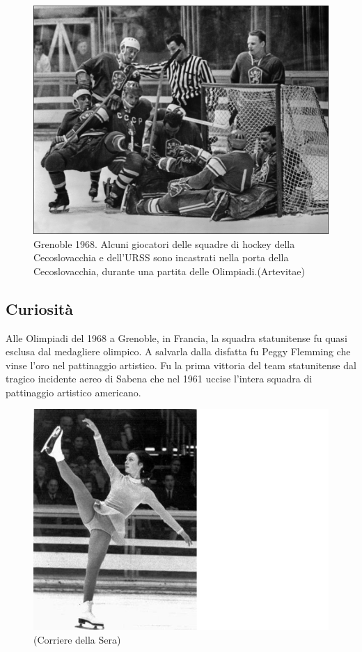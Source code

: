 \documentclass[
]{book}
\begin{document}
\begin{figure}
\includegraphics[width=0.8\linewidth]{images/ArteVitae/1968} \caption{Grenoble 1968. Alcuni giocatori delle squadre di hockey della Cecoslovacchia e dell’URSS sono incastrati nella porta della Cecoslovacchia, durante una partita delle Olimpiadi.(Artevitae)}\label{fig:unnamed-chunk-30}
\end{figure}

\subsection*{Curiosità}\label{curiosituxe0-2}

Alle Olimpiadi del 1968 a Grenoble, in Francia, la squadra statunitense fu quasi esclusa dal medagliere olimpico. A salvarla dalla disfatta fu Peggy Flemming che vinse l'oro nel pattinaggio artistico. Fu la prima vittoria del team statunitense dal tragico incidente aereo di Sabena che nel 1961 uccise l'intera squadra di pattinaggio artistico americano.

\begin{figure}
\includegraphics[width=0.8\linewidth]{images/corriere/1968} \caption{(Corriere della Sera)}\label{fig:unnamed-chunk-31}
\end{figure}
\end{document}
